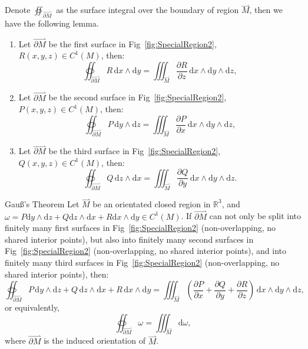 \documentclass[11pt]{../../TexTemplate/elegantbook}
\begin{document}
Denote \(\oiint_{\overset{\rightharpoonup}{\partial M}}\) as the surface integral
over the boundary of region \(\overset{\rightharpoonup}{M}\), then we have the following lemma.
\begin{lemma}
    \begin{enumerate}
        \item Let \(\overset{\rightharpoonup}{\partial M}\) be the first surface in Fig~\ref{fig:SpecialRegion2},
            \(R(x, y, z) \in C^{1}(M)\), then:
            \[
            \oiint_{\overset{\rightharpoonup}{\partial M}} R \, \mathrm{d}x \wedge \mathrm{d}y = 
            \iiint_{\overset{\rightharpoonup}{M}} \frac{\partial R}{\partial z} \, \mathrm{d}x \wedge \mathrm{d}y \wedge \mathrm{d}z,
            \] 
        \item Let \(\overset{\rightharpoonup}{\partial M}\) be the second surface in Fig~\ref{fig:SpecialRegion2},
            \(P(x, y, z) \in C^{1}(M)\), then:
            \[
            \oiint_{\overset{\rightharpoonup}{\partial M}} P \, \mathrm{d}y \wedge \mathrm{d}z = 
            \iiint_{\overset{\rightharpoonup}{M}} \frac{\partial P}{\partial x} \, \mathrm{d}x \wedge \mathrm{d}y \wedge \mathrm{d}z,
            \]
        \item Let \(\overset{\rightharpoonup}{\partial M}\) be the third surface in Fig~\ref{fig:SpecialRegion2},
            \(Q(x, y, z) \in C^{1}(M)\), then:
            \[
            \oiint_{\overset{\rightharpoonup}{\partial M}} Q \, \mathrm{d}z \wedge \mathrm{d}x = 
            \iiint_{\overset{\rightharpoonup}{M}} \frac{\partial Q}{\partial y} \, \mathrm{d}x \wedge \mathrm{d}y \wedge \mathrm{d}z.
            \]
    \end{enumerate}
\end{lemma}

\begin{theorem}{Gauß's Theorem}
    Let \(\overset{\rightharpoonup}{M}\) be an orientated closed region in \(\mathbb{R}^{3}\),
    and \(\omega = P\mathrm{d}y \wedge \mathrm{d}z + Q \mathrm{d}z \wedge \mathrm{d}x 
    + R \mathrm{d}x \wedge \mathrm{d}y \in C^{1}(M)\).
    If \(\overset{\rightharpoonup}{\partial M}\) can not only be split into finitely many first surfaces 
    in Fig~\ref{fig:SpecialRegion2}
    (non-overlapping, no shared interior points),
    but also into finitely many second surfaces in Fig~\ref{fig:SpecialRegion2} (non-overlapping, no shared interior points),
    and into finitely many third surfaces in Fig~\ref{fig:SpecialRegion2} (non-overlapping, no shared interior points),
    then:
    \[
    \oiint_{\overset{\rightharpoonup}{\partial M}} P \, \mathrm{d}y \wedge \mathrm{d}z + Q \, \mathrm{d}z \wedge \mathrm{d}x + R \, \mathrm{d}x \wedge \mathrm{d}y = 
    \iiint_{\overset{\rightharpoonup}{M}} \left( 
        \frac{\partial P}{\partial x} + 
        \frac{\partial Q}{\partial y} + 
        \frac{\partial R}{\partial z} 
    \right) \, \mathrm{d}x \wedge \mathrm{d}y \wedge \mathrm{d}z,
    \]
    or equivalently,
    \[
    \oiint_{\overset{\rightharpoonup}{\partial M}} \omega = 
    \iiint_{\overset{\rightharpoonup}{M}} \mathrm{d}\omega,
    \]
    where \(\overset{\rightharpoonup}{\partial M}\) is the induced orientation of \(\overset{\rightharpoonup}{M}\).
\end{theorem}
\end{document}
